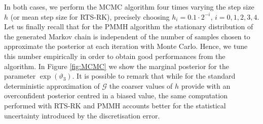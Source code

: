 \documentclass{siamart1116}
\numberwithin{theorem}{section}
\renewcommand{\theta}{\vartheta}
\begin{document}
In both cases, we perform the MCMC algorithm four times varying the step size $h$ (or mean step size for RTS-RK), precisely choosing $h_i = 0.1\cdot2^{-i}$, $i = 0, 1, 2, 3, 4$. Let us finally recall that for the PMMH algorithm the stationary distribution of the generated Markov chain is independent of the number of samples chosen to approximate the posterior at each iteration with Monte Carlo. Hence, we tune this number empirically in order to obtain good performances from the algorithm. In Figure \ref{fig:MCMC} we show the marginal posterior for the parameter $\exp(\theta_3)$. It is possible to remark that while for the standard deterministic approximation of $\mathcal{G}$ the coarser values of $h$ provide with an overconfident posterior centred in a biased value, the same computation performed with RTS-RK and PMMH accounts better for the statistical uncertainty introduced by the discretisation error.




\end{document}
